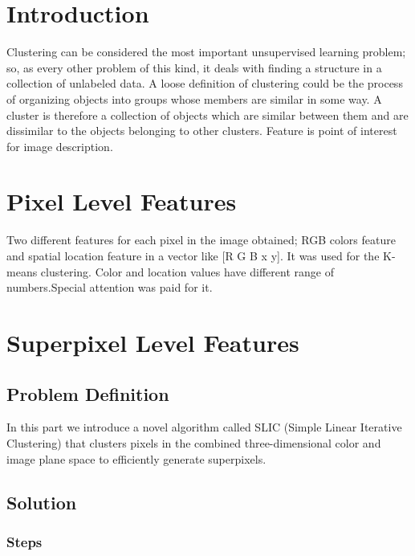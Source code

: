\documentclass[12pt]{article}
\begin{document}

\tableofcontents
\pagebreak

\section*{Introduction}
Clustering can be considered the most important unsupervised learning problem; so, as every other problem of this kind, it deals with finding a structure in a collection of unlabeled data.
A loose definition of clustering could be the process of organizing objects into groups whose members are similar in some way.
A cluster is therefore a collection of objects which are similar between them and are dissimilar to the objects belonging to other clusters. Feature is point of interest for image description.


\section{Pixel Level Features}

Two different features for each pixel in the image obtained; RGB colors feature and spatial location feature in a vector like [R G B x y]. It was used for the K-means clustering. Color and location values have different range of numbers.Special attention was paid for it.

\section{Superpixel Level Features}
\subsection{Problem Definition}
In this part we introduce a novel algorithm called SLIC (Simple Linear Iterative Clustering) that clusters pixels in the combined three-dimensional color and image plane space to efficiently generate superpixels. 

\subsection{Solution}
\subsubsection{Steps}
\end{document}
